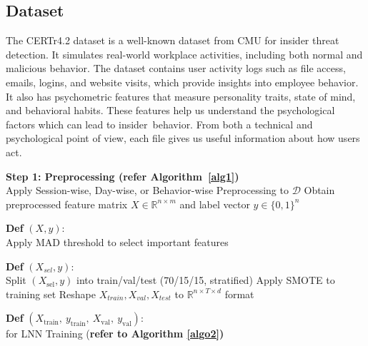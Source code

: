 \subsection{Dataset}
The CERTr4.2 dataset is a well-known dataset from CMU for insider threat detection. It simulates real-world workplace activities, including both normal and malicious behavior. The dataset contains user activity logs such as file access, emails, logins, and website visits, which provide insights into employee behavior. It also has psychometric features that measure personality traits, state of mind, and behavioral habits. These features help us understand the psychological factors which can lead to insider behavior.  From both a technical and psychological point of view, each file gives us useful information about how users act. 
\begin{algorithm}
\caption{Insider Threat Detection via Causal Feature Selection and LNNs}\label{alg2}
\DontPrintSemicolon
\LinesNumbered
\small
{}

\vspace{0.3cm}
\textbf{Step 1: Preprocessing (refer Algorithm~\ref{alg1})} \\
\Indp
Apply Session-wise, Day-wise, or Behavior-wise Preprocessing to $\mathcal{D}$\;
Obtain preprocessed feature matrix $X \in \mathbb{R}^{n \times m}$ and label vector $y \in \{0,1\}^n$\;
\Indm

\vspace{0.2cm}
\textbf{Def} $(X, y)$:\ \\
\Indp {}
Apply MAD threshold to select important features\;
\Indm {}

\vspace{0.2cm}
\textbf{Def} $(X_{sel}, y)$:\ \\
\Indp
Split $(X_{\text{sel}}, y)$ into train/val/test (70/15/15, stratified)\;
Apply SMOTE to training set\;
Reshape $X_{train}, X_{val}, X_{test}$ to $\mathbb{R}^{n \times T \times d}$ format\;
\Indm {}

\vspace{0.2cm}
\textbf{Def} $(X_{\text{train}},\ y_{\text{train}},\ X_{\text{val}},\ y_{\text{val}})$:\ \\
\Indp
for LNN Training (\textbf{refer to Algorithm \ref{algo2}) } \\
\Indm {}


\end{algorithm}
